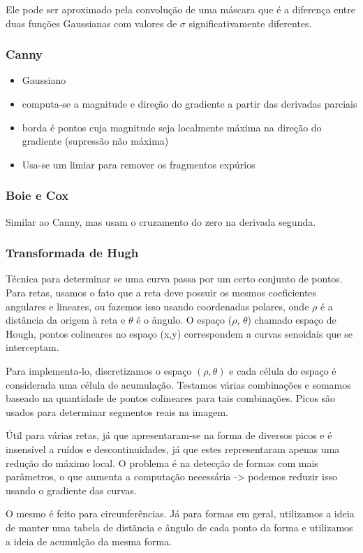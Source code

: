 \documentclass[twocolumn, 10pt]{article}
\begin{document}
Ele pode ser aproximado pela convolução de uma máscara que é a diferença entre duas funções Gaussianas com valores de \(\sigma\) significativamente diferentes.
\subsubsection*{Canny}
\label{sec:org1d45b3f}
\begin{itemize}
\item Gaussiano
\item computa-se a magnitude e direção do gradiente a partir das derivadas parciais
\item borda é pontos cuja magnitude seja localmente máxima na direção do gradiente (supressão não máxima)
\item Usa-se um limiar para remover os fragmentos expúrios
\end{itemize}
\subsubsection*{Boie e Cox}
\label{sec:org223b6b2}
Similar ao Canny, mas usam o cruzamento do zero na derivada segunda.
\subsubsection*{Transformada de Hugh}
\label{sec:orge5e0786}
Técnica para determinar se uma curva passa por um certo conjunto de pontos.
Para retas, usamos o fato que a reta deve possuir os mesmos coeficientes angulares e lineares, ou fazemos isso usando coordenadas polares, onde \(\rho\) é a distância da origem à reta e \(\theta\) é o ângulo.
O espaço (\(\rho\), \(\theta\)) chamado espaço de Hough, pontos colineares no espaço (x,y) correspondem a curvas senoidais que se interceptam.

Para implementa-lo, discretizamos o espaço \((\rho,\theta)\) e cada célula do espaço é considerada uma célula de acumulação.
Testamos várias combinações e somamos baseado na quantidade de pontos colineares para tais combinações.
Picos são usados para determinar segmentos reais na imagem.

Útil para várias retas, já que apresentaram-se na forma de diversos picos e é insensível a ruídos e descontinuidades, já que estes representaram apenas uma redução do máximo local.
O problema é na detecção de formas com mais parâmetros, o que aumenta a computação necessária -> podemos reduzir isso usando o gradiente das curvas.

O mesmo é feito para circunferências. Já para formas em geral, utilizamos a ideia de manter uma tabela de distãncia e ângulo de cada ponto da forma e utilizamos a ideia de acumulção da mesma forma.
\end{document}
